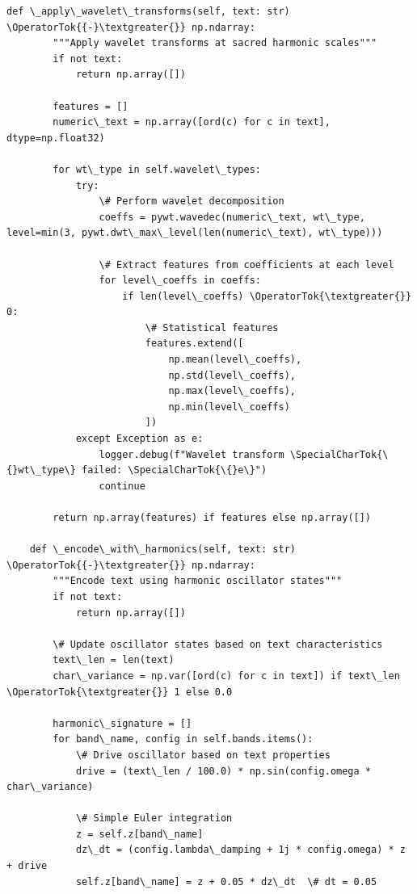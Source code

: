 \documentclass[12pt]{article}
\begin{document}
\begin{lstlisting}[basicstyle=\ttfamily\small]
    def \_apply\_wavelet\_transforms(self, text: str) \OperatorTok{{-}\textgreater{}} np.ndarray:
        """Apply wavelet transforms at sacred harmonic scales"""
        if not text:
            return np.array([])
        
        features = []
        numeric\_text = np.array([ord(c) for c in text], dtype=np.float32)
        
        for wt\_type in self.wavelet\_types:
            try:
                \# Perform wavelet decomposition
                coeffs = pywt.wavedec(numeric\_text, wt\_type, level=min(3, pywt.dwt\_max\_level(len(numeric\_text), wt\_type)))
                
                \# Extract features from coefficients at each level
                for level\_coeffs in coeffs:
                    if len(level\_coeffs) \OperatorTok{\textgreater{}} 0:
                        \# Statistical features
                        features.extend([
                            np.mean(level\_coeffs),
                            np.std(level\_coeffs),
                            np.max(level\_coeffs),
                            np.min(level\_coeffs)
                        ])
            except Exception as e:
                logger.debug(f"Wavelet transform \SpecialCharTok{\{}wt\_type\} failed: \SpecialCharTok{\{}e\}")
                continue
        
        return np.array(features) if features else np.array([])
    
    def \_encode\_with\_harmonics(self, text: str) \OperatorTok{{-}\textgreater{}} np.ndarray:
        """Encode text using harmonic oscillator states"""
        if not text:
            return np.array([])
        
        \# Update oscillator states based on text characteristics
        text\_len = len(text)
        char\_variance = np.var([ord(c) for c in text]) if text\_len \OperatorTok{\textgreater{}} 1 else 0.0
        
        harmonic\_signature = []
        for band\_name, config in self.bands.items():
            \# Drive oscillator based on text properties
            drive = (text\_len / 100.0) * np.sin(config.omega * char\_variance)
            
            \# Simple Euler integration
            z = self.z[band\_name]
            dz\_dt = (config.lambda\_damping + 1j * config.omega) * z + drive
            self.z[band\_name] = z + 0.05 * dz\_dt  \# dt = 0.05
            

\end{lstlisting}
\end{document}
